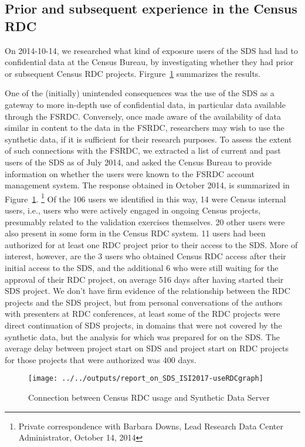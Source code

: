 \subsection{Prior and subsequent experience in the Census RDC}
\label{sec:prior}



On 2014-10-14, we researched what kind of exposure users of the \ac{SDS} had had to confidential data at the Census Bureau, by investigating whether they had prior or subsequent Census RDC projects. Firgure~\ref{fig:rdcUse} summarizes the results.


One of the (initially) unintended consequences was the use of the \ac{SDS} as a gateway to more in-depth use of confidential data, in particular data available through the \ac{FSRDC}. Conversely, once made aware of the availability of data similar in content to the data in the \ac{FSRDC}, researchers may wish to use the synthetic data, if it is sufficient for their research purposes. To assess the extent of such connections with the \ac{FSRDC}, we extracted a list of current and past users of the \ac{SDS} as of July 2014, and asked the Census Bureau to provide information on whether the users were known to the \ac{FSRDC} account management system. The response obtained in October 2014, is summarized in  Figure~\ref{fig:rdcUse}.%
\footnote{Private correspondence with Barbara Downs, Lead Research Data Center Administrator, October 14, 2014}
Of the 106 users we identified in this way, 14 were Census internal users, i.e., users who were actively engaged in ongoing Census projects, presumably related to the validation exercises themselves.
20 other users were also present in some form in the Census RDC system. 11 users had been authorized for at least one RDC project prior to their access to the \ac{SDS}.
More of interest, however, are the 3 users who obtained Census RDC access after their initial access to the \ac{SDS},
and the additional 6 who were still waiting for the approval of their RDC project, on average
516
days after having started their SDS project.
We don't have firm evidence of the relationship between the RDC projects and the SDS project, but from personal conversations of the authors with presenters at RDC conferences, at least some of the RDC projects were direct continuation of SDS projects, in domains that were not covered by the synthetic data, but the analysis for which was prepared for on the \ac{SDS}. The average delay between project start on \ac{SDS} and project start on RDC projects for those projects that were authorized was 400 days.


\begin{figure}
\centering
\caption{Connection between Census RDC usage and Synthetic Data Server}\label{fig:rdcUse}
\texttt{[image: ../../outputs/report\_on\_SDS\_ISI2017-useRDCgraph]}
\end{figure}

